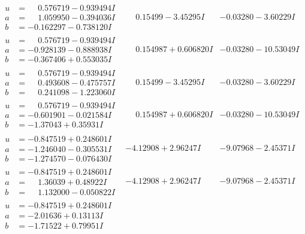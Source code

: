 \documentclass[1p]{elsarticle_modified}
\theoremstyle{definition}
\begin{document}
$$\begin{array}{c|c|c}
\begin{aligned}
u &= \phantom{-}0.576719 - 0.939494 I \\
a &= \phantom{-}1.059950 - 0.394036 I \\
b &= -0.162297 - 0.738120 I\end{aligned}
 & \phantom{-}0.15499 - 3.45295 I & -0.03280 - 3.60229 I \\ \hline\begin{aligned}
u &= \phantom{-}0.576719 - 0.939494 I \\
a &= -0.928139 - 0.888938 I \\
b &= -0.367406 + 0.553035 I\end{aligned}
 & \phantom{-}0.154987 + 0.606820 I & -0.03280 - 10.53049 I \\ \hline\begin{aligned}
u &= \phantom{-}0.576719 - 0.939494 I \\
a &= \phantom{-}0.493608 - 0.475757 I \\
b &= \phantom{-}0.241098 - 1.223060 I\end{aligned}
 & \phantom{-}0.15499 - 3.45295 I & -0.03280 - 3.60229 I \\ \hline\begin{aligned}
u &= \phantom{-}0.576719 - 0.939494 I \\
a &= -0.601901 - 0.021584 I \\
b &= -1.37043 + 0.35931 I\end{aligned}
 & \phantom{-}0.154987 + 0.606820 I & -0.03280 - 10.53049 I \\ \hline\begin{aligned}
u &= -0.847519 + 0.248601 I \\
a &= -1.246040 - 0.305531 I \\
b &= -1.274570 - 0.076430 I\end{aligned}
 & -4.12908 + 2.96247 I & -9.07968 - 2.45371 I \\ \hline\begin{aligned}
u &= -0.847519 + 0.248601 I \\
a &= \phantom{-}1.36039 + 0.48922 I \\
b &= \phantom{-}1.132000 - 0.050822 I\end{aligned}
 & -4.12908 + 2.96247 I & -9.07968 - 2.45371 I \\ \hline\begin{aligned}
u &= -0.847519 + 0.248601 I \\
a &= -2.01636 + 0.13113 I \\
b &= -1.71522 + 0.79951 I\end{aligned}

\end{array}$$
\end{document}
